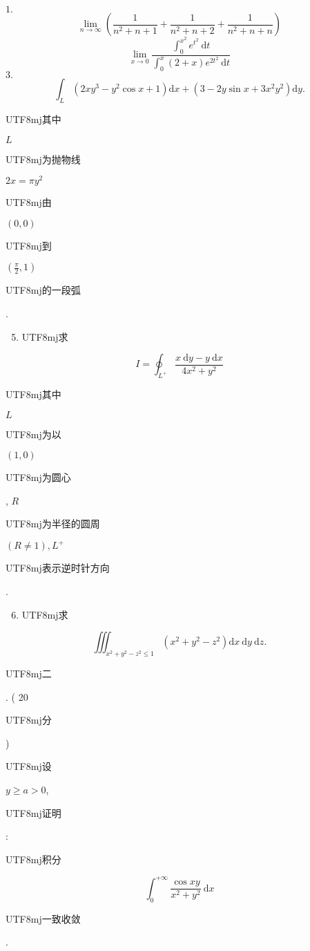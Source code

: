 \documentclass[10pt]{article}
\begin{document}
$1 .$
$$
\lim _{n \rightarrow \infty}\left(\frac{1}{n^{2}+n+1}+\frac{1}{n^{2}+n+2}+\frac{1}{n^{2}+n+n}\right)
$$
$$
\lim _{x \rightarrow 0} \frac{\int_{0}^{x^{2}} e^{t^{2}} \mathrm{~d} t}{\int_{0}^{x}(2+x) e^{2 t^{2}} \mathrm{~d} t}
$$
$3 .$
$$
\int_{L}\left(2 x y^{3}-y^{2} \cos x+1\right) \mathrm{d} x+\left(3-2 y \sin x+3 x^{2} y^{2}\right) \mathrm{d} y .
$$
\begin{CJK}{UTF8}{mj}其中\end{CJK} $L$ \begin{CJK}{UTF8}{mj}为抛物线\end{CJK} $2 x=\pi y^{2}$ \begin{CJK}{UTF8}{mj}由\end{CJK} $(0,0)$ \begin{CJK}{UTF8}{mj}到\end{CJK} $\left(\frac{\pi}{2}, 1\right)$ \begin{CJK}{UTF8}{mj}的一段弧\end{CJK}.

\begin{enumerate}
  \setcounter{enumi}{4}
  \item \begin{CJK}{UTF8}{mj}求\end{CJK}
\end{enumerate}
$$
I=\oint_{L^{+}} \frac{x \mathrm{~d} y-y \mathrm{~d} x}{4 x^{2}+y^{2}}
$$
\begin{CJK}{UTF8}{mj}其中\end{CJK} $L$ \begin{CJK}{UTF8}{mj}为以\end{CJK} $(1,0)$ \begin{CJK}{UTF8}{mj}为圆心\end{CJK}, $R$ \begin{CJK}{UTF8}{mj}为半径的圆周\end{CJK} $(R \neq 1), L^{+}$\begin{CJK}{UTF8}{mj}表示逆时针方向\end{CJK}.

\begin{enumerate}
  \setcounter{enumi}{5}
  \item \begin{CJK}{UTF8}{mj}求\end{CJK}
\end{enumerate}
$$
\iiint_{x^{2}+y^{2}-z^{2} \leqslant 1}\left(x^{2}+y^{2}-z^{2}\right) \mathrm{d} x \mathrm{~d} y \mathrm{~d} z .
$$
\begin{CJK}{UTF8}{mj}二\end{CJK}. ( 20 \begin{CJK}{UTF8}{mj}分\end{CJK}) \begin{CJK}{UTF8}{mj}设\end{CJK} $y \geqslant a>0$, \begin{CJK}{UTF8}{mj}证明\end{CJK}: \begin{CJK}{UTF8}{mj}积分\end{CJK}
$$
\int_{0}^{+\infty} \frac{\cos x y}{x^{2}+y^{2}} \mathrm{~d} x
$$
\begin{CJK}{UTF8}{mj}一致收敛\end{CJK}.
\end{document}
